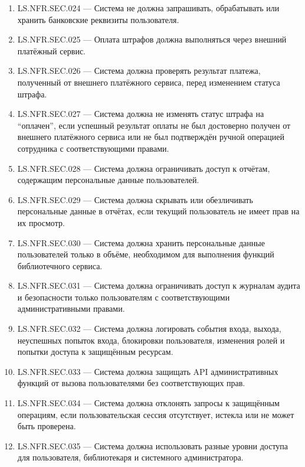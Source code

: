 \documentclass[12pt,a4paper]{article}
\begin{document}
\begin{enumerate}
		\item LS.NFR.SEC.024 --- Система не должна запрашивать, обрабатывать или хранить
		банковские реквизиты пользователя.
		
		\item LS.NFR.SEC.025 --- Оплата штрафов должна выполняться через внешний
		платёжный сервис.
		
		\item LS.NFR.SEC.026 --- Система должна проверять результат платежа, полученный
		от внешнего платёжного сервиса, перед изменением статуса штрафа.
		
		\item LS.NFR.SEC.027 --- Система должна не изменять статус штрафа на ``оплачен'',
		если успешный результат оплаты не был достоверно получен от внешнего платёжного
		сервиса или не был подтверждён ручной операцией сотрудника с соответствующими
		правами.
		
		\item LS.NFR.SEC.028 --- Система должна ограничивать доступ к отчётам, содержащим
		персональные данные пользователей.
		
		\item LS.NFR.SEC.029 --- Система должна скрывать или обезличивать персональные
		данные в отчётах, если текущий пользователь не имеет прав на их просмотр.
		
		\item LS.NFR.SEC.030 --- Система должна хранить персональные данные пользователей
		только в объёме, необходимом для выполнения функций библиотечного сервиса.
		
		\item LS.NFR.SEC.031 --- Система должна ограничивать доступ к журналам аудита
		и безопасности только пользователям с соответствующими административными
		правами.
		
		\item LS.NFR.SEC.032 --- Система должна логировать события входа, выхода,
		неуспешных попыток входа, блокировки пользователя, изменения ролей и попытки
		доступа к защищённым ресурсам.
		
		\item LS.NFR.SEC.033 --- Система должна защищать API административных функций
		от вызова пользователями без соответствующих прав.
		
		\item LS.NFR.SEC.034 --- Система должна отклонять запросы к защищённым операциям,
		если пользовательская сессия отсутствует, истекла или не может быть проверена.
		
		\item LS.NFR.SEC.035 --- Система должна использовать разные уровни доступа
		для пользователя, библиотекаря и системного администратора.
	\end{enumerate}
	
\end{document}
